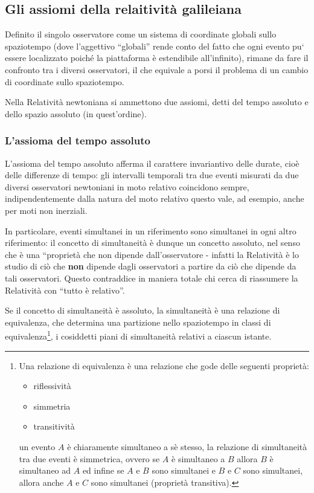 \subsection{Gli assiomi della relaitività galileiana}

Definito il singolo osservatore come un sistema di coordinate globali sullo
spaziotempo (dove l’aggettivo ``globali'' rende conto del fatto che ogni evento
pu` essere localizzato poiché la piattaforma è estendibile all’infinito), rimane
da fare il confronto tra i diversi osservatori, il che equivale a porsi il problema
di un cambio di coordinate sullo spaziotempo.

Nella Relatività newtoniana si ammettono due assiomi, detti del tempo 
assoluto e dello spazio assoluto (in quest’ordine).

\subsubsection{L'assioma del tempo assoluto}
L'assioma del tempo assoluto afferma il carattere invariantivo delle durate, cioè delle differenze di tempo:
gli intervalli temporali tra due eventi misurati da due diversi osservatori newtoniani in moto relativo 
coincidono sempre, indipendentemente dalla natura del moto relativo questo vale, ad esempio, anche per moti non inerziali. 

In particolare, eventi simultanei in un riferimento sono simultanei in ogni altro
riferimento: il concetto di simultaneità è dunque un concetto assoluto, nel senso che è una ``proprietà
 che non dipende dall'osservatore - infatti la Relatività è lo studio di ciò che \textbf{non} 
dipende dagli osservatori a partire da ciò che dipende da tali osservatori. Questo contraddice in maniera totale chi cerca
di riassumere la Relatività con ``tutto è relativo''.

Se il concetto di simultaneità è assoluto, la simultaneità è una relazione di equivalenza,
che determina una partizione nello spaziotempo in classi di equivalenza\footnote{Una relazione di equivalenza è una 
relazione che gode delle seguenti proprietà:
\begin{itemize}
 \item riflessività
 \item simmetria
 \item transitività
\end{itemize}
un evento $A$ è chiaramente simultaneo a sè stesso, la relazione di simultaneità tra due eventi è simmetrica, ovvero 
se $A$ è simultaneo a $B$ allora $B$ è simultaneo ad $A$ ed infine se $A$ e $B$ sono simultanei e $B$ e $C$ sono simultanei, 
allora anche $A$ e $C$ sono simultanei (proprietà transitiva).}, i cosiddetti piani di simultaneità relativi a ciascun istante.

